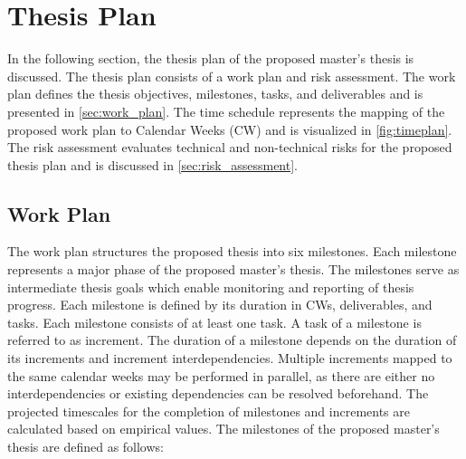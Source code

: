 \chapter{Thesis Plan}
\label{ch:project_plan}
In the following section, the thesis plan of the proposed master's thesis is discussed.
The thesis plan consists of a work plan and risk assessment.
The work plan defines the thesis objectives, milestones, tasks, and deliverables and is presented in \autoref{sec:work_plan}.
The time schedule represents the mapping of the proposed work plan to Calendar Weeks (CW) and is visualized in \autoref{fig:timeplan}.
The risk assessment evaluates technical and non-technical risks for the proposed thesis plan and is discussed in \autoref{sec:risk_assessment}.

\section{Work Plan}
\label{sec:work_plan}
The work plan structures the proposed thesis into six milestones.
Each milestone represents a major phase of the proposed master's thesis.
The milestones serve as intermediate thesis goals which enable monitoring and reporting of thesis progress.
Each milestone is defined by its duration in CWs, deliverables, and tasks.
Each milestone consists of at least one task.
A task of a milestone is referred to as increment.
The duration of a milestone depends on the duration of its increments and increment interdependencies.
Multiple increments mapped to the same calendar weeks may be performed in parallel, as there are either no interdependencies or existing dependencies can be resolved beforehand.
The projected timescales for the completion of milestones and increments are calculated based on empirical values.
The milestones of the proposed master's thesis are defined as follows:
